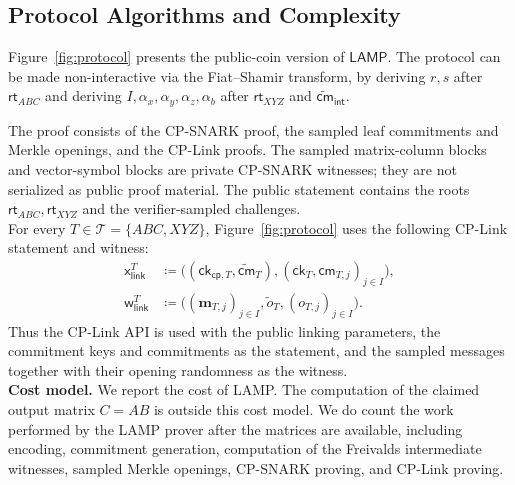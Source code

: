 \documentclass[conference,compsoc]{IEEEtran}
\newcommand{\cm}{\textsf{cm}}
\newcommand{\rt}{\textsf{rt}}
\newcommand{\ck}{\textsf{ck}}
\newcommand{\vect}{\mathbf}         %
\newcommand{\cp}{{\mathsf{cp}}}
\renewcommand{\ck}{{\textsf{ck}}}
\newcommand{\stmt}{\mathsf{x}}      %
\newcommand{\wit}{\mathsf{w}}       %
\newcommand{\protocol}{\textsf{LAMP}}   %
\theoremstyle{plain}
\theoremstyle{definition}
\theoremstyle{remark}
\begin{document}
\subsection{Protocol Algorithms and Complexity}
\label{sec:protocol-complexity}
Figure~\ref{fig:protocol} presents the public-coin version of
\(\protocol\).  The protocol can be made non-interactive via the
Fiat--Shamir transform, by deriving \(r\ensuremath{, s}\) after \(\rt_{ABC}\) and deriving
\(I,\alpha_x,\alpha_y,\alpha_z\ensuremath{, \alpha_b}\) after \(\rt_{XYZ}\)
and \ensuremath{\widetilde{\cm}_{\mathsf{int}}}.

The proof consists of the CP-SNARK proof, the sampled leaf commitments and
Merkle openings, and the CP-Link proofs.  The sampled matrix-column blocks and
vector-symbol blocks are private CP-SNARK witnesses; they are not serialized as
public proof material.
The public statement contains the roots
\(\rt_{ABC},\rt_{XYZ}\) and the verifier-sampled challenges. \\

For every \(T\in\mathcal{T}=\{ABC,XYZ\}\), Figure~\ref{fig:protocol} uses the
following CP-Link statement and witness:
\[
\begin{aligned}
  \stmt_{\mathsf{link}}^T
  &\coloneqq
  \big(
    (\ck_{\cp,T},\widetilde{\cm}_{T}),
    (\ck_T,\cm_{T,j})_{j\in I}
  \big),\\
  \wit_{\mathsf{link}}^T
  &\coloneqq
  \big(
    (\vect{m}_{T,j})_{j\in I},
    \widetilde{o}_{T},
    (o_{T,j})_{j\in I}
  \big).
\end{aligned}
\]
Thus the CP-Link API is used with the public linking parameters, the commitment
keys and commitments as the statement, and the sampled messages together with
their opening randomness as the witness. \\

\noindent\textbf{Cost model.}
We report the cost of \protocol.  The computation of the claimed output matrix \(C=AB\) is outside this cost model.  
We do count the work performed by the \protocol{} prover after the matrices are available, including encoding, commitment generation, computation of the Freivalds intermediate witnesses, sampled Merkle openings, CP-SNARK proving, and CP-Link proving.
\end{document}
